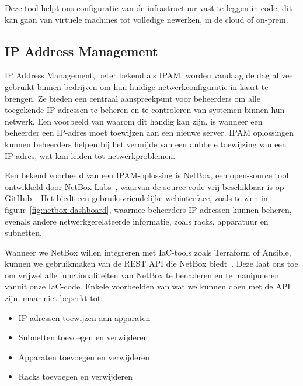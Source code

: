 Deze tool helpt ons configuratie van de infrastructuur vast te leggen in code, dit kan gaan van virtuele machines tot volledige newerken, in de cloud of on-prem.

\subsection{IP Address Management}
\label{sub:ipam}

IP Address Management, beter bekend als IPAM, worden vandaag de dag al veel gebruikt binnen bedrijven om hun huidige netwerkconfiguratie in kaart te brengen.
Ze bieden een centraal aanspreekpunt voor beheerders om alle toegekende IP-adressen te beheren en te controleren van systemen binnen hun netwerk.
Een voorbeeld van waarom dit handig kan zijn, is wanneer een beheerder een IP-adres moet toewijzen aan een nieuwe server.
IPAM oplossingen kunnen beheerders helpen bij het vermijde van een dubbele toewijzing van een IP-adres, wat kan leiden tot netwerkproblemen.

Een bekend voorbeeld van een IPAM-oplossing is NetBox, een open-source tool ontwikkeld door NetBox Labs~\autocite{netbox-ipam}, waarvan de source-code vrij beschikbaar is op GitHub~\autocite{netbox-github}.
Het biedt een gebruiksvriendelijke webinterface, zoals te zien in figuur~\ref{fig:netbox-dashboard}, waarmee beheerders IP-adressen kunnen beheren, evenals andere netwerkgerelateerde informatie, zoals racks, apparatuur en subnetten.

Wanneer we NetBox willen integreren met IaC-tools zoals Terraform of Ansible, kunnen we gebruikmaken van de REST API die NetBox biedt~\autocite{netbox-api}.
Deze laat ons toe om vrijwel alle functionaliteiten van NetBox te benaderen en te manipuleren vanuit onze IaC-code.
Enkele voorbeelden van wat we kunnen doen met de API zijn, maar niet beperkt tot:

\begin{itemize}
    \item IP-adressen toewijzen aan apparaten
    \item Subnetten toevoegen en verwijderen
    \item Apparaten toevoegen en verwijderen
    \item Racks toevoegen en verwijderen
\end{itemize}

